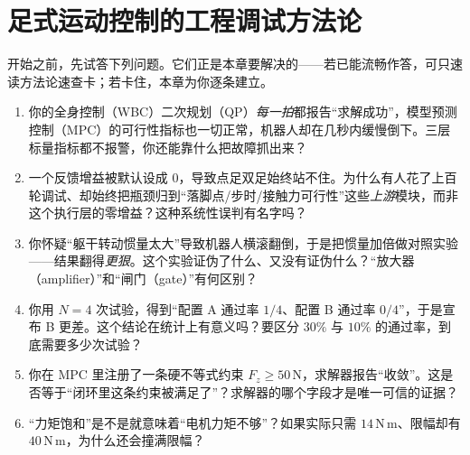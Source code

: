 \chapter{足式运动控制的工程调试方法论}
\label{ch:legged-debug}


\begin{practice}[前置自测]
开始之前，先试答下列问题。它们正是本章要解决的——若已能流畅作答，可只速读方法论速查卡；若卡住，本章为你逐条建立。
\begin{enumerate}
  \item 你的全身控制（WBC）二次规划（QP）\emph{每一拍}都报告“求解成功”，模型预测控制（MPC）的可行性指标也一切正常，机器人却在几秒内缓慢倒下。三层标量指标都不报警，你还能靠什么把故障抓出来？
  \item 一个反馈增益被默认设成 $0$，导致点足双足始终站不住。为什么有人花了上百轮调试、却始终把瓶颈归到“落脚点/步时/接触力可行性”这些\emph{上游}模块，而非这个执行层的零增益？这种系统性误判有名字吗？
  \item 你怀疑“躯干转动惯量太大”导致机器人横滚翻倒，于是把惯量加倍做对照实验——结果翻得\emph{更狠}。这个实验证伪了什么、又没有证伪什么？“放大器（amplifier）”和“闸门（gate）”有何区别？
  \item 你用 $N=4$ 次试验，得到“配置 A 通过率 $1/4$、配置 B 通过率 $0/4$”，于是宣布 B 更差。这个结论在统计上有意义吗？要区分 $30\%$ 与 $10\%$ 的通过率，到底需要多少次试验？
  \item 你在 MPC 里注册了一条硬不等式约束 $F_z\ge 50\,\mathrm{N}$，求解器报告“收敛”。这是否等于“闭环里这条约束被满足了”？求解器的哪个字段才是唯一可信的证据？
  \item “力矩饱和”是不是就意味着“电机力矩不够”？如果实际只需 $14\,\mathrm{N\,m}$、限幅却有 $40\,\mathrm{N\,m}$，为什么还会撞满限幅？
\end{enumerate}
\end{practice}

